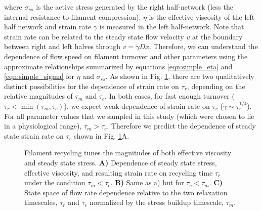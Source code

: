 \documentclass[10pt,letterpaper]{article}
\begin{document}
where $\sigma_{ss}$ is the active stress generated by the right half-network (less the internal resistance to filament compression), $\eta$ is the effective viscosity of the left half network and strain rate $\dot{\gamma}$ is measured in the left half-network.  Note that strain rate can be related to the steady state flow velocity $v$ at the boundary between right and left halves through $ v = \dot{\gamma}Dx$. Therefore, we can understand the dependence of flow speed on filament turnover and other parameters using the approximate relationships summarized by equations \ref{eqn:simple_eta} and \ref{eqn:simple_sigma} for $\eta$ and $\sigma_{ss}$.  As shown in Fig. \ref{fig:flow_theo}, there are two qualitatively distinct possibilities for the dependence of strain rate on $\tau_r$, depending on the relative magnitudes of $\tau_m$ and $\tau_c$.  In both cases, for fast enough turnover ($\tau_r < \min \left (\tau_m, \tau_c \right )$), we expect weak dependence of strain rate on $\tau_r$ ($ \dot{\gamma}\sim \tau_r^{1/4}$).  For all parameter values that we sampled in this study (which were chosen to lie in a physiological range), $\tau_m > \tau_c$. Therefore we predict the dependence of steady state strain rate on $\tau_r$ shown in Fig. \ref{fig:flow_theo}A.


\begin{figure}[h!]
	\centering
	\caption{\label{fig:flow_theo}  Filament recycling tunes the magnitudes of both effective viscosity and steady state stress. \textbf{A)}  Dependence of steady state stress, effective viscosity, and resulting strain rate on recycling time $\tau_r$ under the condition $\tau_{m}<\tau_c$. \textbf{B)} Same as a) but for $\tau_c<\tau_{m}$.  \textbf{C)} State space of flow rate dependence relative to the two relaxation timescales, $\tau_r$ and $\tau_c$ normalized by the stress buildup timescale, $\tau_{m}$.  }
\end{figure}
\end{document}
